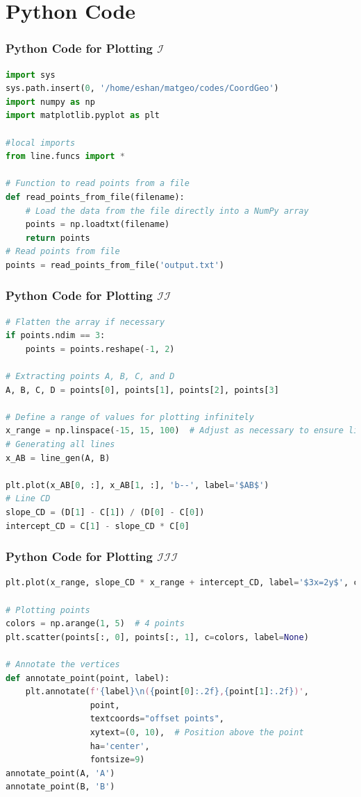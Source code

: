 \documentclass{beamer}
\theoremstyle{remark}
\numberwithin{equation}{section}
\begin{document}
\section{Python Code}
\begin{frame}[fragile]
\frametitle{Python Code for Plotting $\mathcal{I}$}
\begin{lstlisting}[language=Python]
import sys                                         
sys.path.insert(0, '/home/eshan/matgeo/codes/CoordGeo')      
import numpy as np
import matplotlib.pyplot as plt

#local imports
from line.funcs import *

# Function to read points from a file
def read_points_from_file(filename):
    # Load the data from the file directly into a NumPy array
    points = np.loadtxt(filename)
    return points
# Read points from file
points = read_points_from_file('output.txt')
\end{lstlisting}
\end{frame}
\begin{frame}[fragile]
\frametitle{Python Code for Plotting $\mathcal{II}$}
\begin{lstlisting}[language=Python]
# Flatten the array if necessary
if points.ndim == 3:
    points = points.reshape(-1, 2)

# Extracting points A, B, C, and D
A, B, C, D = points[0], points[1], points[2], points[3]

# Define a range of values for plotting infinitely
x_range = np.linspace(-15, 15, 100)  # Adjust as necessary to ensure lines extend sufficiently
# Generating all lines
x_AB = line_gen(A, B)

plt.plot(x_AB[0, :], x_AB[1, :], 'b--', label='$AB$')
# Line CD
slope_CD = (D[1] - C[1]) / (D[0] - C[0])
intercept_CD = C[1] - slope_CD * C[0]
\end{lstlisting}
\end{frame}
\begin{frame}[fragile]
\frametitle{Python Code for Plotting $\mathcal{III}$}
\begin{lstlisting}[language=Python]
plt.plot(x_range, slope_CD * x_range + intercept_CD, label='$3x=2y$', color='red')

# Plotting points
colors = np.arange(1, 5)  # 4 points
plt.scatter(points[:, 0], points[:, 1], c=colors, label=None)

# Annotate the vertices
def annotate_point(point, label):
    plt.annotate(f'{label}\n({point[0]:.2f},{point[1]:.2f})',
                 point,
                 textcoords="offset points",
                 xytext=(0, 10),  # Position above the point
                 ha='center',
                 fontsize=9)              
annotate_point(A, 'A')
annotate_point(B, 'B')
\end{lstlisting}
\end{frame}
\end{document}
